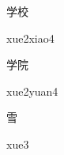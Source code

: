 \begin{multicols*}{2}
\begin{verbete}{学校}
\begin{pronuncia}{xue2xiao4}
\end{pronuncia}
\end{verbete}

\begin{verbete}{学院}
\begin{pronuncia}{xue2yuan4}
\end{pronuncia}
\end{verbete}

\begin{verbete}[xue3]{雪}
\begin{pronuncia}{xue3}
\end{pronuncia}
\end{verbete}

\end{multicols*}
